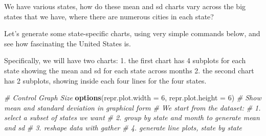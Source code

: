 \documentclass[
]{book}
\newenvironment{Shaded}{\begin{snugshade}}{\end{snugshade}}
\newcommand{\CommentTok}[1]{\textcolor[rgb]{0.56,0.35,0.01}{\textit{#1}}}
\newcommand{\DataTypeTok}[1]{\textcolor[rgb]{0.13,0.29,0.53}{#1}}
\newcommand{\DecValTok}[1]{\textcolor[rgb]{0.00,0.00,0.81}{#1}}
\newcommand{\KeywordTok}[1]{\textcolor[rgb]{0.13,0.29,0.53}{\textbf{#1}}}
\newcommand{\NormalTok}[1]{#1}
\begin{document}
We have various states, how do these mean and sd charts vary across the big states that we have, where there are numerous cities in each state?

Let's generate some state-specific charts, using very simple commands below, and see how fascinating the United States is.

Specifically, we will have two charts:
1. the first chart has 4 subplots for each state showing the mean and sd for each state across months
2. the second chart has 2 subplots, showing inside each four lines for the four states.

\begin{Shaded}
\begin{Highlighting}[]
\CommentTok{\# Control Graph Size}
\KeywordTok{options}\NormalTok{(}\DataTypeTok{repr.plot.width =} \DecValTok{6}\NormalTok{, }\DataTypeTok{repr.plot.height =} \DecValTok{6}\NormalTok{)}
\CommentTok{\# Show mean and standard deviation in graphical form}
\CommentTok{\# We start from the dataset:}
\CommentTok{\# 1. select a subset of states we want}
\CommentTok{\# 2. group by state and month to generate mean and sd}
\CommentTok{\# 3. reshape data with gather}
\CommentTok{\# 4. generate line plots, state by state}


\end{Highlighting}
\end{Shaded}
\end{document}
